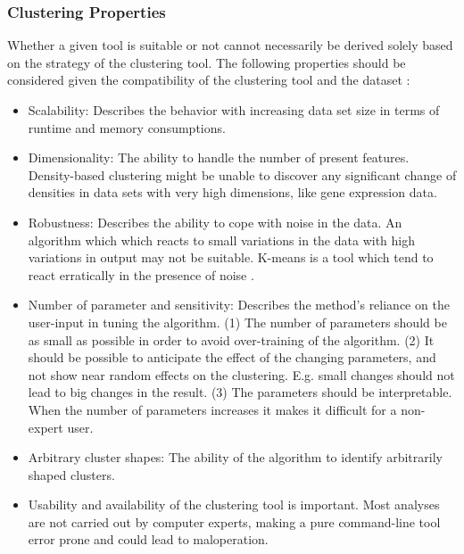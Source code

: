 \documentclass[a4paper,10pt]{article}
\theoremstyle{plain}
\theoremstyle{definition}
\begin{document}
\subsubsection{Clustering Properties}
Whether a given tool is suitable or not cannot necessarily be derived solely based on the strategy of the clustering tool. The following properties should be considered given the compatibility of the clustering tool and the dataset \cite{64overview, 15overview}:
\begin{itemize}
	\item Scalability: Describes the behavior with increasing data set size in terms of runtime and memory consumptions.
	\item Dimensionality: The ability to handle the number of present features. Density-based clustering might be unable to discover any significant change of densities in data sets with very high dimensions, like gene expression data.
	\item Robustness: Describes the ability to cope with noise in the data. An algorithm which which reacts to small variations in the data with high variations in output may not be suitable. K-means is a tool which tend to react erratically in the presence of noise \cite{94overview}.
	\item Number of parameter and sensitivity: Describes the method's reliance on the user-input in tuning the algorithm. (1) The number of parameters should be as small as possible in order to avoid over-training of the algorithm. (2) It should be possible to anticipate the effect of the changing parameters, and not show near random effects on the clustering. E.g. small changes should not lead to big changes in the result. (3) The parameters should be interpretable. When the number of parameters increases it makes it difficult for a non-expert user.
	\item Arbitrary cluster shapes: The ability of the algorithm to identify arbitrarily shaped clusters.
	\item Usability and availability of the clustering tool is important. Most analyses are not carried out by computer experts, making a pure command-line tool error prone and could lead to maloperation.
\end{itemize}

\end{document}
